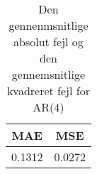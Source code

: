 \begin{table}
\center
\begin{tabular}{cc}
\toprule
 MAE & MSE \\ \midrule
 0.1312 & 0.0272 \\ \bottomrule
\end{tabular}
\caption{Den gennenmsnitlige absolut fejl og den gennemsnitlige kvadreret fejl for AR(4)} \label{tab:tabs_ar}
\end{table}
